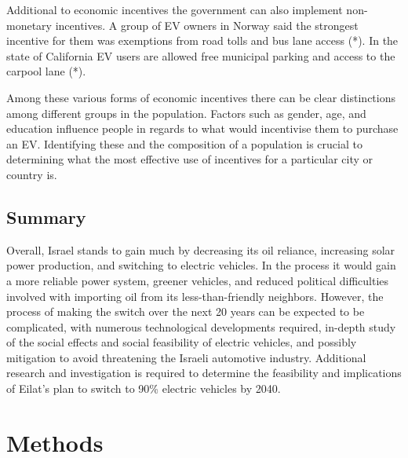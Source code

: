 \documentclass{article}                         %
\begin{document}
Additional to economic incentives the government can also implement non-monetary incentives. A group of EV owners in Norway said the strongest incentive for them was exemptions from road tolls and bus lane access (*). In the state of California EV users are allowed free municipal parking and access to the carpool lane (*). 

Among these various forms of economic incentives there can be clear distinctions among different groups in the population. Factors such as gender, age, and education influence people in regards to what would incentivise them to purchase an EV. Identifying these and the composition of a population is crucial to determining what the most effective use of incentives for a particular city or country is.


\subsection{Summary}

Overall, Israel stands to gain much by decreasing its oil reliance, increasing solar power production, and switching to electric vehicles. In the process it would gain a more reliable power system, greener vehicles, and reduced political difficulties involved with importing oil from its less-than-friendly neighbors. However, the process of making the switch over the next 20 years can be expected to be complicated, with numerous technological developments required, in-depth study of the social effects and social feasibility of electric vehicles, and possibly mitigation to avoid threatening the Israeli automotive industry. Additional research and investigation is required to determine the feasibility and implications of Eilat's plan to switch to 90\% electric vehicles by 2040.\

\newpage
\section{Methods}


\newpage
\bigskip


\end{document}
